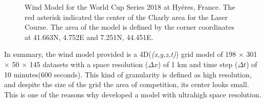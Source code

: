 \begin{figure} [hb!]
  \centering
  \caption{Wind Model for the World Cup Series 2018 at Hyéres, France. The red asterisk indicated the center of the Charly area for the Laser Course. The area of the model is defined by the corner coordinates at 41.663\degree N, 4.752\degree E and 7.251\degree N, 44.451\degree E.}
\label{fig:wind_model_FR} 
\end{figure}
In summary, the wind model provided is a 4D(\textit{(x,y,z,t)}) grid model of 198 $\times$ 301 $\times$ 50 $\times$ 145 datasets with a space resolution ($\Delta x$) of 1 km and time step ($\Delta t$) of 10 minutes(600 seconds). This kind of granularity is defined as high resolution, and despite the size of the grid the area of competition, its center looks small. This is one of the reasons why \cite{giannaros2018ultrahigh} developed a model with ultrahigh space resolution.\par  

